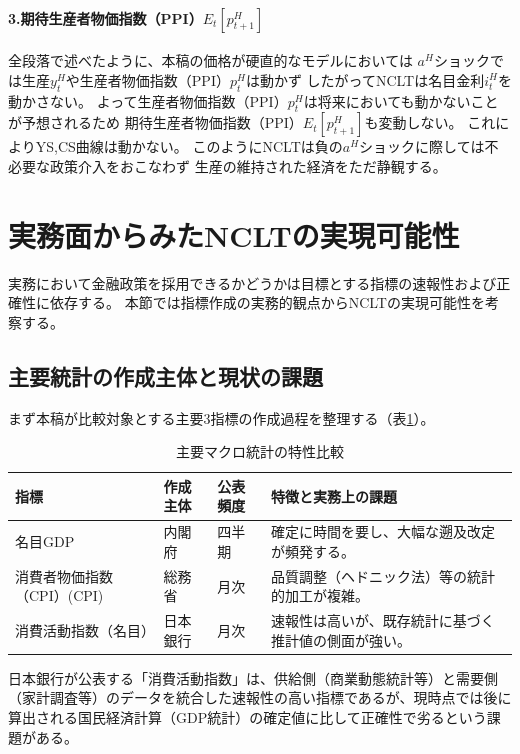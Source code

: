 \paragraph{3.期待生産者物価指数（PPI）\(E_t[p_{t+1}^H]\)}\label{sec:discussion_as_ad_a_shock_ppi}
全段落で述べたように、本稿の価格が硬直的なモデルにおいては
\(a^H\)ショックでは生産\(y_t^H\)や生産者物価指数（PPI）\(p_t^H\)は動かず
したがってNCLTは名目金利\(i_t^H\)を動かさない。
よって生産者物価指数（PPI）\(p_t^H\)は将来においても動かないことが予想されるため
期待生産者物価指数（PPI）\(E_t[p_{t+1}^H]\)も変動しない。
これによりYS,CS曲線は動かない。
このようにNCLTは負の\(a^H\)ショックに際しては不必要な政策介入をおこなわず
生産の維持された経済をただ静観する。

\section{実務面からみたNCLTの実現可能性}
\label{sec:discussion_practicality}
実務において金融政策を採用できるかどうかは目標とする指標の速報性および正確性に依存する。
本節では指標作成の実務的観点からNCLTの実現可能性を考察する。

\subsection{主要統計の作成主体と現状の課題}
\label{sec:discussion_practicality_stats}
まず本稿が比較対象とする主要3指標の作成過程を整理する（表\ref{tab:stat_comparison}）。
\begin{table}[H]
\centering
\caption{主要マクロ統計の特性比較}
\label{tab:stat_comparison}
\small
\begin{tabular}{lllp{20em}}
\toprule
指標 & 作成主体 & 公表頻度 & 特徴と実務上の課題 \\
\midrule
名目GDP & 内閣府 & 四半期 & 確定に時間を要し、大幅な遡及改定が頻発する。 \\
消費者物価指数（CPI）(CPI) & 総務省 & 月次 & 品質調整（ヘドニック法）等の統計的加工が複雑。 \\
消費活動指数（名目） & 日本銀行 & 月次 & 速報性は高いが、既存統計に基づく推計値の側面が強い。 \\
\bottomrule
\end{tabular}
\end{table}
日本銀行が公表する「消費活動指数」は、供給側（商業動態統計等）と需要側（家計調査等）のデータを統合した速報性の高い指標であるが、現時点では後に算出される国民経済計算（GDP統計）の確定値に比して正確性で劣るという課題がある。

